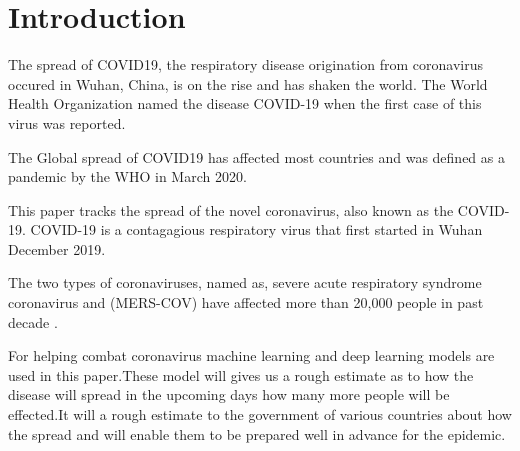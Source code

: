 \section{Introduction}

The spread of COVID19, the respiratory disease origination from coronavirus
occured in Wuhan, China, is on the rise and has shaken the world. The World
Health Organization named the disease COVID-19 when the first case of this
virus was reported.

The Global spread of COVID19 has affected most countries and was defined as a
pandemic by the WHO in March 2020.

This paper tracks the spread of the novel coronavirus, also known as the
COVID-19. COVID-19 is a contagagious respiratory virus that first started in
Wuhan December 2019. \cite{data_world}

The two types of coronaviruses, named as, severe acute respiratory syndrome
coronavirus and (MERS-COV) have affected more than
20,000 people in past decade \cite{huang2020clinical}.

For helping combat coronavirus machine learning and deep learning models are used in this paper.These model
will gives us a rough estimate as to how the disease will spread in the upcoming days how many more people
will be effected.It will a rough estimate to the government of various countries about how the spread and will
enable them to be prepared well in advance for the epidemic.

